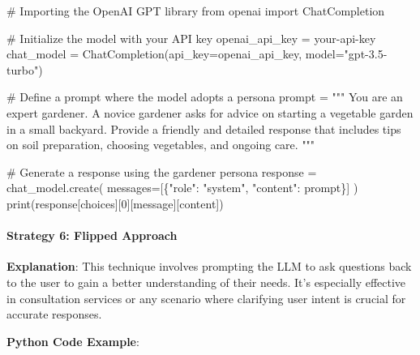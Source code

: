 \documentclass[
]{agujournal2019}
\let\oldparagraph\paragraph
\renewcommand{\paragraph}[1]{\oldparagraph{#1}\mbox{}}
\newenvironment{Shaded}{\begin{snugshade}}{\end{snugshade}}
\newcommand{\BuiltInTok}[1]{\textcolor[rgb]{0.00,0.23,0.31}{#1}}
\newcommand{\CommentTok}[1]{\textcolor[rgb]{0.37,0.37,0.37}{#1}}
\newcommand{\DecValTok}[1]{\textcolor[rgb]{0.68,0.00,0.00}{#1}}
\newcommand{\ImportTok}[1]{\textcolor[rgb]{0.00,0.46,0.62}{#1}}
\newcommand{\NormalTok}[1]{\textcolor[rgb]{0.00,0.23,0.31}{#1}}
\newcommand{\OperatorTok}[1]{\textcolor[rgb]{0.37,0.37,0.37}{#1}}
\newcommand{\StringTok}[1]{\textcolor[rgb]{0.13,0.47,0.30}{#1}}
\begin{document}
\begin{Shaded}
\begin{Highlighting}[]
\CommentTok{\# Importing the OpenAI GPT library}
\ImportTok{from}\NormalTok{ openai }\ImportTok{import}\NormalTok{ ChatCompletion}

\CommentTok{\# Initialize the model with your API key}
\NormalTok{openai\_api\_key }\OperatorTok{=} \StringTok{\textquotesingle{}your{-}api{-}key\textquotesingle{}}
\NormalTok{chat\_model }\OperatorTok{=}\NormalTok{ ChatCompletion(api\_key}\OperatorTok{=}\NormalTok{openai\_api\_key, model}\OperatorTok{=}\StringTok{"gpt{-}3.5{-}turbo"}\NormalTok{)}

\CommentTok{\# Define a prompt where the model adopts a persona}
\NormalTok{prompt }\OperatorTok{=} \StringTok{"""}
\StringTok{You are an expert gardener. A novice gardener asks for advice on starting a vegetable garden in a small backyard. Provide a friendly and detailed response that includes tips on soil preparation, choosing vegetables, and ongoing care.}
\StringTok{"""}

\CommentTok{\# Generate a response using the gardener persona}
\NormalTok{response }\OperatorTok{=}\NormalTok{ chat\_model.create(}
\NormalTok{    messages}\OperatorTok{=}\NormalTok{[\{}\StringTok{"role"}\NormalTok{: }\StringTok{"system"}\NormalTok{, }\StringTok{"content"}\NormalTok{: prompt\}]}
\NormalTok{)}
\BuiltInTok{print}\NormalTok{(response[}\StringTok{\textquotesingle{}choices\textquotesingle{}}\NormalTok{][}\DecValTok{0}\NormalTok{][}\StringTok{\textquotesingle{}message\textquotesingle{}}\NormalTok{][}\StringTok{\textquotesingle{}content\textquotesingle{}}\NormalTok{])}
\end{Highlighting}
\end{Shaded}

\paragraph{Strategy 6: Flipped
Approach}\label{strategy-6-flipped-approach}

\textbf{Explanation}: This technique involves prompting the LLM to ask
questions back to the user to gain a better understanding of their
needs. It's especially effective in consultation services or any
scenario where clarifying user intent is crucial for accurate responses.

\textbf{Python Code Example}:
\end{document}
